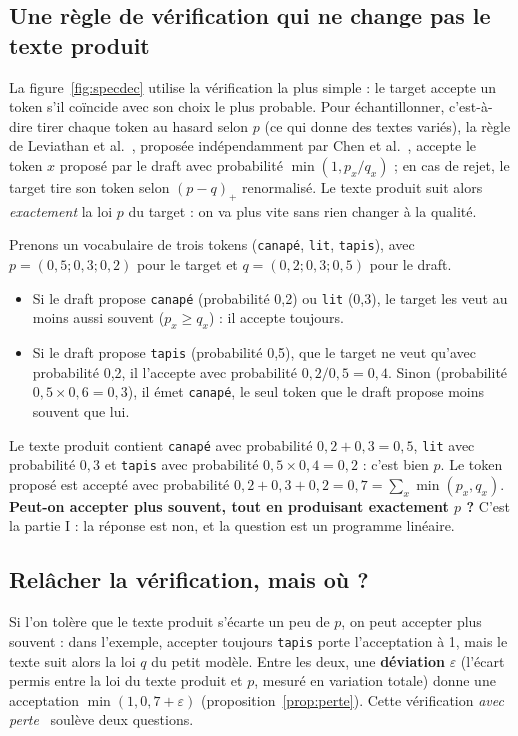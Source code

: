 \documentclass[11pt,a4paper]{article}
\newcommand{\tok}[1]{\texttt{#1}}
\theoremstyle{plain}
\theoremstyle{definition}
\begin{document}
\subsection{Une règle de vérification qui ne change pas le texte produit}\label{sec:regle}
La figure~\ref{fig:specdec} utilise la vérification la plus simple : le target accepte un token s'il coïncide avec son choix le plus probable.
Pour échantillonner, c'est-à-dire tirer chaque token au hasard selon $p$ (ce qui donne des textes variés), la règle de Leviathan et al.~\cite{leviathan}, proposée indépendamment par Chen et al.~\cite{chen}, accepte le token $x$ proposé par le draft avec probabilité $\min(1,p_x/q_x)$ ; en cas de rejet, le target tire son token selon $(p-q)_+$ renormalisé.
Le texte produit suit alors \emph{exactement} la loi $p$ du target : on va plus vite sans rien changer à la qualité.

Prenons un vocabulaire de trois tokens (\tok{canapé}, \tok{lit}, \tok{tapis}), avec $p=(0{,}5;0{,}3;0{,}2)$ pour le target et $q=(0{,}2;0{,}3;0{,}5)$ pour le draft.
\begin{itemize}
\item Si le draft propose \tok{canapé} (probabilité 0,2) ou \tok{lit} (0,3), le target les veut au moins aussi souvent ($p_x\ge q_x$) : il accepte toujours.
\item Si le draft propose \tok{tapis} (probabilité 0,5), que le target ne veut qu'avec probabilité 0,2, il l'accepte avec probabilité $0{,}2/0{,}5=0{,}4$. Sinon (probabilité $0{,}5\times0{,}6=0{,}3$), il émet \tok{canapé}, le seul token que le draft propose moins souvent que lui.
\end{itemize}
Le texte produit contient \tok{canapé} avec probabilité $0{,}2+0{,}3=0{,}5$, \tok{lit} avec probabilité $0{,}3$ et \tok{tapis} avec probabilité $0{,}5\times0{,}4=0{,}2$ : c'est bien $p$.
Le token proposé est accepté avec probabilité $0{,}2+0{,}3+0{,}2=0{,}7=\sum_x\min(p_x,q_x)$.
\textbf{Peut-on accepter plus souvent, tout en produisant exactement $p$ ?} C'est la partie I : la réponse est non, et la question est un programme linéaire.

\subsection{Relâcher la vérification, mais où ?}\label{sec:ou}
Si l'on tolère que le texte produit s'écarte un peu de $p$, on peut accepter plus souvent : dans l'exemple, accepter toujours \tok{tapis} porte l'acceptation à 1, mais le texte suit alors la loi $q$ du petit modèle.
Entre les deux, une \textbf{déviation} $\varepsilon$ (l'écart permis entre la loi du texte produit et $p$, mesuré en variation totale) donne une acceptation $\min(1,0{,}7+\varepsilon)$ (proposition~\ref{prop:perte}).
Cette vérification \emph{avec perte}~\cite{fuzzy} soulève deux questions.
\end{document}
